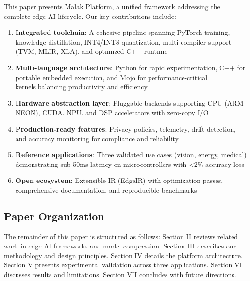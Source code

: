 This paper presents Malak Platform, a unified framework addressing the complete edge AI lifecycle. Our key contributions include:

\begin{enumerate}
\item \textbf{Integrated toolchain}: A cohesive pipeline spanning PyTorch training, knowledge distillation, INT4/INT8 quantization, multi-compiler support (TVM, MLIR, XLA), and optimized C++ runtime
\item \textbf{Multi-language architecture}: Python for rapid experimentation, C++ for portable embedded execution, and Mojo for performance-critical kernelsbalancing productivity and efficiency
\item \textbf{Hardware abstraction layer}: Pluggable backends supporting CPU (ARM NEON), CUDA, NPU, and DSP accelerators with zero-copy I/O
\item \textbf{Production-ready features}: Privacy policies, telemetry, drift detection, and accuracy monitoring for compliance and reliability
\item \textbf{Reference applications}: Three validated use cases (vision, energy, medical) demonstrating sub-50ms latency on microcontrollers with <2\% accuracy loss
\item \textbf{Open ecosystem}: Extensible IR (EdgeIR) with optimization passes, comprehensive documentation, and reproducible benchmarks
\end{enumerate}

\subsection{Paper Organization}

The remainder of this paper is structured as follows: Section II reviews related work in edge AI frameworks and model compression. Section III describes our methodology and design principles. Section IV details the platform architecture. Section V presents experimental validation across three applications. Section VI discusses results and limitations. Section VII concludes with future directions.
